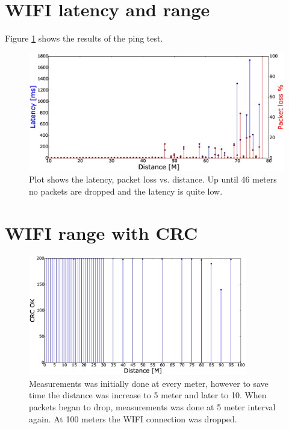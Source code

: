 \section{WIFI latency and range} \label{sec:result_wifi_range_ping}
Figure \ref{fig:wifi_pingtest} shows the results of the ping test.

\begin{figure}[H]
    \center
    \includegraphics[width=1\textwidth]{graphics/wifi_test_latency_1.eps}
  \caption{Plot shows the latency, packet loss vs. distance. Up until 46 meters no packets are dropped and the latency is quite low.}
    \label{fig:wifi_pingtest}
\end{figure}


\section{WIFI range with CRC} \label{sec:result_wifi_range_crc}
\begin{figure}[H]
    \center
    \includegraphics[width=0.85\textwidth]{graphics/crc_distance_check.eps}
	\caption{Measurements was initially done at every meter, however to save time the distance was increase to 5 meter and later to 10. When packets began to drop, measurements was done at 5 meter interval again. At 100 meters the WIFI connection was dropped.}
    \label{fig:wifi_crc_check}
\end{figure}




